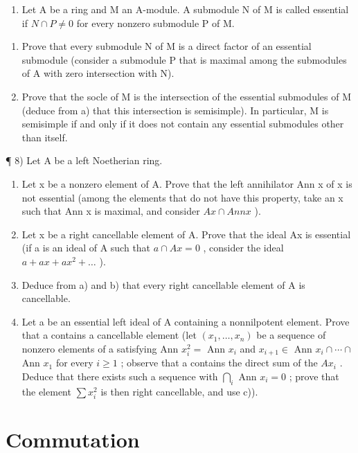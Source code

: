 \begin{enumerate}
\def\labelenumi{\arabic{enumi})}
\setcounter{enumi}{6}
\tightlist
\item
  Let A be a ring and M an A-module. A submodule N of M is called essential if \(N \cap P \neq 0\) for every nonzero submodule P of M.
\end{enumerate}

\begin{enumerate}
\def\labelenumi{\alph{enumi})}
\item
  Prove that every submodule N of M is a direct factor of an essential submodule (consider a submodule P that is maximal among the submodules of A with zero intersection with N).
\item
  Prove that the socle of M is the intersection of the essential submodules of M (deduce from a) that this intersection is semisimple). In particular, M is semisimple if and only if it does not contain any essential submodules other than itself.
\end{enumerate}

¶ 8) Let A be a left Noetherian ring.

\begin{enumerate}
\def\labelenumi{\alph{enumi})}
\item
  Let x be a nonzero element of A. Prove that the left annihilator Ann x of x is not essential (among the elements that do not have this property, take an x such that Ann x is maximal, and consider \(Ax \cap Ann x\) ).
\item
  Let x be a right cancellable element of A. Prove that the ideal Ax is essential (if a is an ideal of A such that \(a \cap Ax = 0\) , consider the ideal \(a + ax + ax^{2} + \ldots\) ).
\item
  Deduce from a) and b) that every right cancellable element of A is cancellable.
\item
  Let a be an essential left ideal of A containing a nonnilpotent element. Prove that a contains a cancellable element (let \((x_{1},\ldots,x_{n})\) be a sequence of nonzero elements of a satisfying Ann \(x_{i}^{2}=\) Ann \(x_{i}\) and \(x_{i+1}\in\) Ann \(x_{i}\cap\cdots\cap\) Ann \(x_{1}\) for every \(i\geqslant1\) ; observe that a contains the direct sum of the \(Ax_{i}\) . Deduce that there exists such a sequence with \(\bigcap_{i}\) Ann \(x_{i}=0\) ; prove that the element \(\sum x_{i}^{2}\) is then right cancellable, and use c)).
\end{enumerate}

\section{Commutation}

